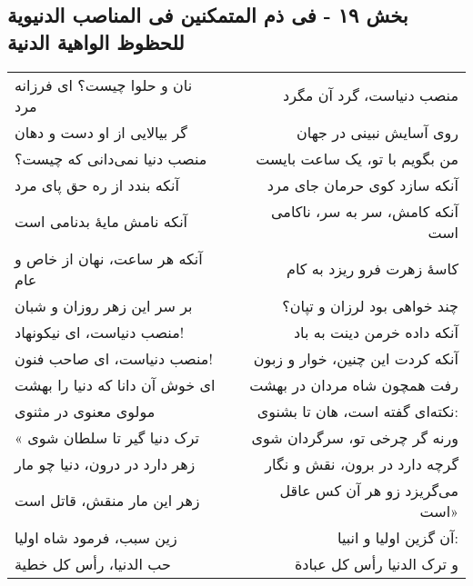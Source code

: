 \begin{center}
\section*{بخش ۱۹ - فی ذم المتمکنین فی المناصب الدنیویة للحظوظ الواهیة الدنیة}
\label{sec:019}
\begin{longtable}{l p{0.5cm} r}
نان و حلوا چیست؟ ای فرزانه مرد
&&
منصب دنیاست، گرد آن مگرد
\\
گر بیالایی از او دست و دهان
&&
روی آسایش نبینی در جهان
\\
منصب دنیا نمی‌دانی که چیست؟
&&
من بگویم با تو، یک ساعت بایست
\\
آنکه بندد از ره حق پای مرد
&&
آنکه سازد کوی حرمان جای مرد
\\
آنکه نامش مایهٔ بدنامی است
&&
آنکه کامش، سر به سر، ناکامی است
\\
آنکه هر ساعت، نهان از خاص و عام
&&
کاسهٔ زهرت فرو ریزد به کام
\\
بر سر این زهر روزان و شبان
&&
چند خواهی بود لرزان و تپان؟
\\
منصب دنیاست، ای نیکونهاد!
&&
آنکه داده خرمن دینت به باد
\\
منصب دنیاست، ای صاحب فنون!
&&
آنکه کردت این چنین، خوار و زبون
\\
ای خوش آن دانا که دنیا را بهشت
&&
رفت همچون شاه مردان در بهشت
\\
مولوی معنوی در مثنوی
&&
نکته‌ای گفته است، هان تا بشنوی:
\\
« ترک دنیا گیر تا سلطان شوی
&&
ورنه گر چرخی تو، سرگردان شوی
\\
زهر دارد در درون، دنیا چو مار
&&
گرچه دارد در برون، نقش و نگار
\\
زهر این مار منقش، قاتل است
&&
می‌گریزد زو هر آن کس عاقل است»
\\
زین سبب، فرمود شاه اولیا
&&
آن گزین اولیا و انبیا:
\\
حب الدنیا، رأس کل خطیة
&&
و ترک الدنیا رأس کل عبادة
\\
\end{longtable}
\end{center}
